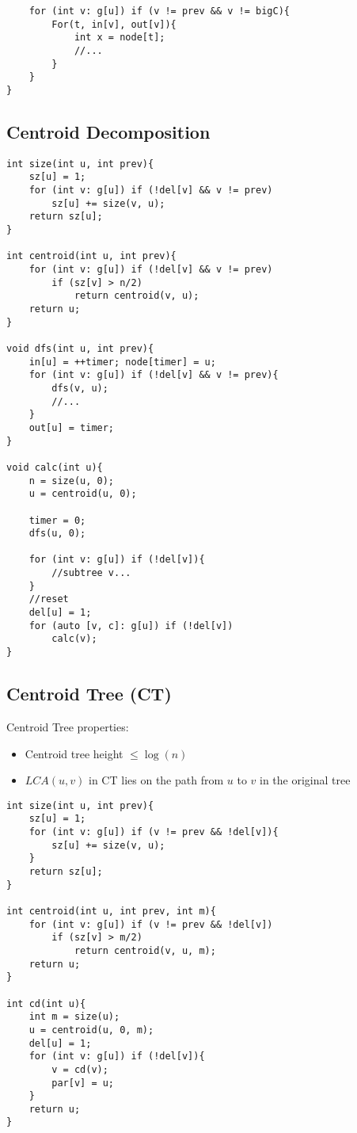 \documentclass[11pt,a4paper]{article}
\begin{document}
\begin{multicols*}{2}
\begin{lstlisting}
	for (int v: g[u]) if (v != prev && v != bigC){
		For(t, in[v], out[v]){
			int x = node[t];
			//...
		}
	}
}
\end{lstlisting}

\subsection{Centroid Decomposition}
\begin{lstlisting}
int size(int u, int prev){
	sz[u] = 1;
	for (int v: g[u]) if (!del[v] && v != prev)
		sz[u] += size(v, u);
	return sz[u];
}

int centroid(int u, int prev){
	for (int v: g[u]) if (!del[v] && v != prev)
		if (sz[v] > n/2)
			return centroid(v, u);
	return u;
}

void dfs(int u, int prev){
    in[u] = ++timer; node[timer] = u;
    for (int v: g[u]) if (!del[v] && v != prev){
        dfs(v, u);
        //...
    }
    out[u] = timer;
}

void calc(int u){
	n = size(u, 0);
	u = centroid(u, 0);
	
	timer = 0;
	dfs(u, 0);
	
    for (int v: g[u]) if (!del[v]){
        //subtree v...
    }
    //reset
	del[u] = 1;
	for (auto [v, c]: g[u]) if (!del[v])
		calc(v);
}
\end{lstlisting}

\subsection{Centroid Tree (CT)}
Centroid Tree properties:
\begin{itemize}
    \item Centroid tree height $ \leq \log(n) $
    \item $LCA(u, v)$ in CT lies on the path from $u$ to $v$ in the original tree
\end{itemize}


\begin{lstlisting}
int size(int u, int prev){
	sz[u] = 1;
	for (int v: g[u]) if (v != prev && !del[v]){
		sz[u] += size(v, u);
	}
    return sz[u];
}
 
int centroid(int u, int prev, int m){
	for (int v: g[u]) if (v != prev && !del[v])
		if (sz[v] > m/2) 
			return centroid(v, u, m);
	return u;
}
 
int cd(int u){
	int m = size(u);
	u = centroid(u, 0, m);
	del[u] = 1;
	for (int v: g[u]) if (!del[v]){
		v = cd(v);
		par[v] = u;
	}
	return u;
}


\end{lstlisting}
\end{multicols*}
\end{document}
